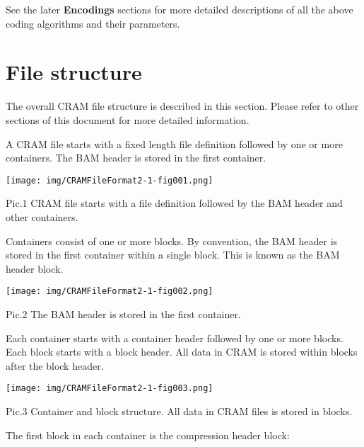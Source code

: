 \documentclass[a4paper]{article}
\begin{document}
See the later \textbf{Encodings} sections for more detailed descriptions of all
the above coding algorithms and their parameters.

\section{\textbf{File structure}}

The overall CRAM file structure is described in this section. Please refer to other 
sections of this document for more detailed information. 

A CRAM file starts with a fixed length file definition followed by one or more 
containers. The BAM header is stored in the first container.

\texttt{[image: img/CRAMFileFormat2-1-fig001.png]}

Pic.1 CRAM file starts with a file definition followed by the BAM header and other 
containers.

Containers consist of one or more blocks. By convention, the BAM header is stored 
in the first container within a single block. This is known as the BAM header block.

\texttt{[image: img/CRAMFileFormat2-1-fig002.png]}

Pic.2 The BAM header is stored in the first container.

Each container starts with a container header followed by one or more blocks. Each 
block starts with a block header. All data in CRAM is stored within blocks after 
the block header.

\texttt{[image: img/CRAMFileFormat2-1-fig003.png]}

Pic.3 Container and block structure. All data in CRAM files is stored in blocks.

The first block in each container is the compression header block:
\end{document}
